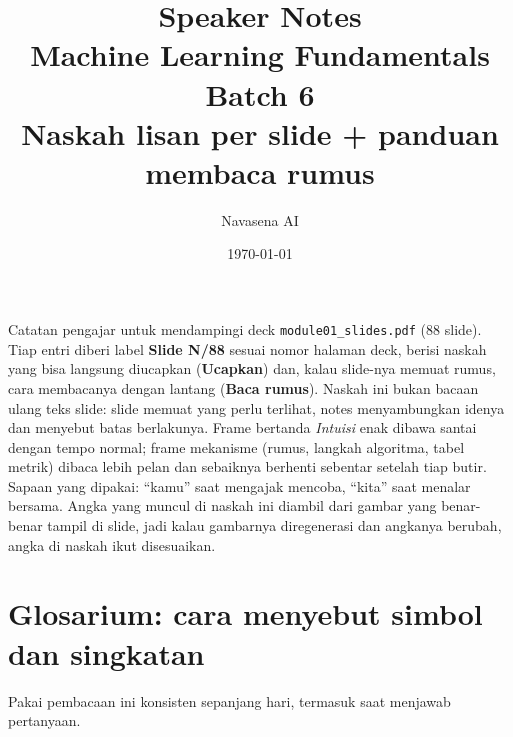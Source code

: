 \documentclass[11pt]{article}
\title{\textbf{Speaker Notes}\\[2mm]\large Machine Learning Fundamentals \textperiodcentered{} Batch 6\\[1mm]\normalsize Naskah lisan per slide + panduan membaca rumus}
\author{Navasena AI}
\date{\today}
\begin{document}
\maketitle
\thispagestyle{empty}

\noindent Catatan pengajar untuk mendampingi deck \texttt{module01\_slides.pdf} (88 slide). Tiap entri diberi label \textbf{Slide N/88} sesuai nomor halaman deck, berisi naskah yang bisa langsung diucapkan (\textbf{Ucapkan}) dan, kalau slide-nya memuat rumus, cara membacanya dengan lantang (\textbf{Baca rumus}). Naskah ini bukan bacaan ulang teks slide: slide memuat yang perlu terlihat, notes menyambungkan idenya dan menyebut batas berlakunya. Frame bertanda \emph{Intuisi} enak dibawa santai dengan tempo normal; frame mekanisme (rumus, langkah algoritma, tabel metrik) dibaca lebih pelan dan sebaiknya berhenti sebentar setelah tiap butir. Sapaan yang dipakai: ``kamu'' saat mengajak mencoba, ``kita'' saat menalar bersama. Angka yang muncul di naskah ini diambil dari gambar yang benar-benar tampil di slide, jadi kalau gambarnya diregenerasi dan angkanya berubah, angka di naskah ikut disesuaikan.

\vspace{4mm}
\section*{Glosarium: cara menyebut simbol dan singkatan}
Pakai pembacaan ini konsisten sepanjang hari, termasuk saat menjawab pertanyaan.
\end{document}
